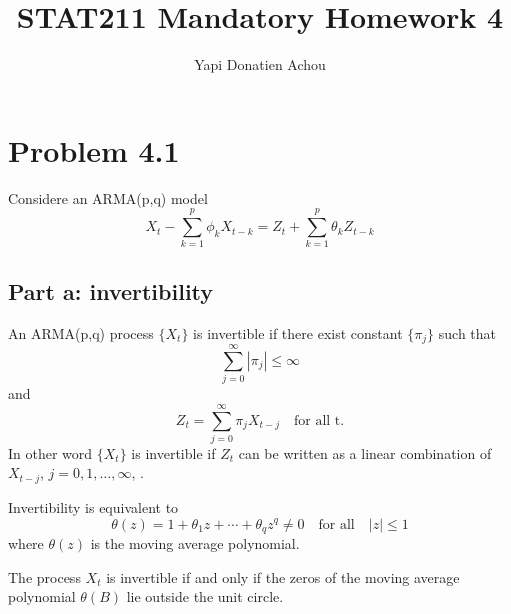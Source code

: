 \documentclass[11pt, oneside]{article}   	%
\title{STAT211 Mandatory Homework 4}
\author{Yapi Donatien Achou}
\begin{document}
\maketitle

\section{Problem 4.1}
Considere an ARMA(p,q) model 
\begin{equation}\label{eq:arma}
X_{t}-\sum_{k=1}^{p}\phi_{k}X_{t-k} = Z_{t}+\sum_{k=1}^{p}\theta_{k}Z_{t-k}
\end{equation}
\subsection{Part a: invertibility}
An ARMA(p,q) process $\{  X_{t}\}$ is invertible if there exist constant $\{  \pi_{j}\}$ such that 
\begin{equation}
\sum_{j=0}^{\infty}|\pi_{j}| \le \infty
\end{equation}
and 
\begin{equation}\label{eq:z}
Z_{t} = \sum_{j=0}^{\infty}\pi_{j}X_{t-j} \quad \text{for all t}.
\end{equation}
In other word $\{  X_{t}\}$ is invertible if $Z_{t}$ can be written as a linear combination of $X_{t-j}$, $j = 0,1, \dots, \infty$, \cite{petter}.

\begin{flushleft}
Invertibility is equivalent to 
\begin{equation}\label{eq:theta}
\theta(z) = 1+ \theta_{1}z+ \cdots + \theta_{q}z^{q}\neq 0 \quad \text{for all} \quad |z| \leq 1
\end{equation}
where $\theta(z)$ is the moving average polynomial.
\end{flushleft}

\begin{flushleft}
The process $X_{t}$ is invertible if and only if the zeros of the moving average polynomial $\theta(B)$ lie outside the unit circle.
\end{flushleft}
\end{document}
